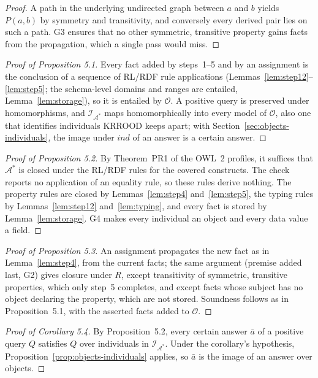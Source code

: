 \begin{proof}
A path in the underlying undirected graph between $a$ and $b$ yields $P(a,b)$ by symmetry and
transitivity, and conversely every derived pair lies on such a path. G3 ensures that no other
symmetric, transitive property gains facts from the propagation, which a single pass would miss.
\end{proof}

\begin{proof}[Proof of Proposition 5.1]
Every fact added by steps~1--5 and by an assignment is the conclusion of a sequence of RL/RDF
rule applications (Lemmas~\ref{lem:step12}--\ref{lem:step5}; the schema-level domains and ranges
are entailed, Lemma~\ref{lem:storage}), so it is entailed by $\mathcal{O}$. A positive query is
preserved under homomorphisms, and $\mathcal{I}_{\mathcal{A}^*}$ maps homomorphically into every
model of $\mathcal{O}$, also one that identifies individuals KRROOD keeps apart; with
Section~\ref{sec:objects-individuals}, the image under $\mathit{ind}$ of an answer is a certain
answer.
\end{proof}

\begin{proof}[Proof of Proposition 5.2]
By Theorem~PR1 of the OWL~2 profiles, it suffices that $\mathcal{A}^*$ is closed under the
RL/RDF rules for the covered constructs. The check reports no application of an equality rule,
so these rules derive nothing. The property rules are closed by Lemmas~\ref{lem:step4}
and~\ref{lem:step5}, the typing rules by Lemmas~\ref{lem:step12} and~\ref{lem:typing}, and every
fact is stored by Lemma~\ref{lem:storage}. G4 makes every individual an object and every data
value a field.
\end{proof}

\begin{proof}[Proof of Proposition 5.3]
An assignment propagates the new fact as in Lemma~\ref{lem:step4}, from the current facts; the
same argument (premise added last, G2) gives closure under $R$, except transitivity of
symmetric, transitive properties, which only step~5 completes, and except facts whose subject has
no object declaring the property, which are not stored. Soundness follows as in
Proposition~5.1, with the asserted facts added to $\mathcal{O}$.
\end{proof}

\begin{proof}[Proof of Corollary 5.4]
By Proposition~5.2, every certain answer $\bar a$ of a positive query $Q$ satisfies $Q$ over
individuals in $\mathcal{I}_{\mathcal{A}^*}$. Under the corollary's hypothesis,
Proposition~\ref{prop:objects-individuals} applies, so $\bar a$ is the image of an answer over
objects.
\end{proof}

